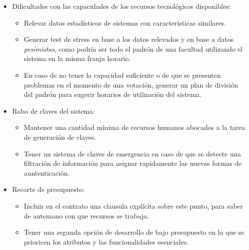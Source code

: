 \begin{itemize}
\item Dificultades con las capacidades de los recursos tecnol\'ogicos disponibles:
\begin{itemize}
\item Relevar datos estad\'isticos de sistemas con caracter\'isticas similares.
\item Generar test de stress en base a los datos relevados y en base a datos \emph{pesimistas}, como podr\'ia ser todo el padr\'on de una facultad utilizando el sistema en la misma franja horario.
\item En caso de no tener la capacidad suficiente o de que se presenten problemas en el momento de una votaci\'on, generar un plan de divisi\'on del padr\'on para sugerir horarios de utilizaci\'on del sistema.
\end{itemize}

\item Robo de claves del sistema:
\begin{itemize}
\item Mantener una cantidad m\'inima de recursos humanos abocados a la tarea de generaci\'on de claves.
\item Tener un sistema de claves de emergencia en caso de que se detecte una filtraci\'on de informaci\'on para asignar rapidamente las nuevas formas de auntenticaci\'on.
\end{itemize}

\item Recorte de presupuesto:
\begin{itemize}
\item Incluir en el contrato una clausula expl\'icita sobre este punto, para saber de antemano con que recursos se trabaja.
\item Tener una segunda opci\'on de desarrollo de bajo presupuesto en la que se prioricen los atributos y las funcionalidades esenciales.
\end{itemize}


\end{itemize}
